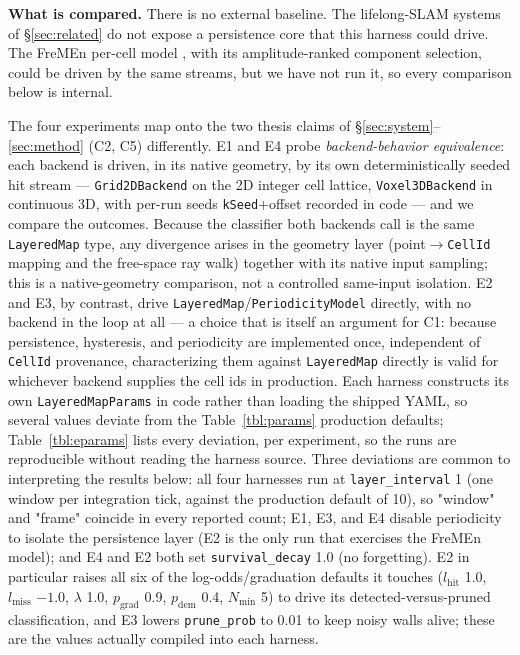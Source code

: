 \documentclass[conference]{IEEEtran}
\begin{document}
\textbf{What is compared.} There is no external baseline. The lifelong-SLAM
systems of \S\ref{sec:related} do not expose a persistence core that this
harness could drive. The FreMEn per-cell model
\cite{krajnik2017fremen,krajnik2016persistent,fremenrepo}, with its
amplitude-ranked component selection, could be driven by the same streams,
but we have not run it, so every comparison below is internal.

The four experiments map onto the two thesis claims of \S\ref{sec:system}--\ref{sec:method} (C2, C5)
differently. E1 and E4 probe \emph{backend-behavior equivalence}: each backend is
driven, in its native geometry, by its own deterministically seeded hit
stream --- \texttt{Grid2DBackend} on the 2D integer cell lattice, \texttt{Voxel3DBackend} in
continuous 3D, with per-run seeds \texttt{kSeed}+offset recorded in code --- and we
compare the outcomes. Because the classifier both backends call is the same
\texttt{LayeredMap} type, any divergence arises in the geometry layer
(point$\to$\texttt{CellId} mapping and the free-space ray walk) together with its
native input sampling; this is a native-geometry comparison, not a controlled
same-input isolation. E2 and E3, by contrast, drive \texttt{LayeredMap}/\texttt{PeriodicityModel}
directly, with no backend in the loop at all --- a choice that is itself an
argument for C1: because persistence, hysteresis, and periodicity are
implemented once, independent of \texttt{CellId} provenance, characterizing them
against \texttt{LayeredMap} directly is valid for whichever backend supplies the
cell ids in production. Each harness constructs its own \texttt{LayeredMapParams}
in code rather than loading the shipped YAML, so several values deviate from
the Table~\ref{tbl:params} production defaults; Table~\ref{tbl:eparams} lists every deviation,
per experiment, so the runs are reproducible without reading the harness
source. Three deviations are common to interpreting the results below: all
four harnesses run at \texttt{layer\_interval} 1 (one window per integration tick,
against the production default of 10), so "window" and "frame" coincide in
every reported count; E1, E3, and E4 disable periodicity to isolate the
persistence layer (E2 is the only run that exercises the FreMEn model); and
E4 and E2 both set \texttt{survival\_decay} 1.0 (no forgetting). E2 in particular
raises all six of the log-odds/graduation defaults it touches
($l_{\text{hit}}$ 1.0, $l_{\text{miss}}$ $-1.0$, $\lambda$ 1.0,
$p_{\text{grad}}$ 0.9, $p_{\text{dem}}$ 0.4, $N_{\min}$ 5) to drive its
detected-versus-pruned classification, and E3 lowers \texttt{prune\_prob} to 0.01 to
keep noisy walls alive; these are the values actually compiled into each
harness.
\end{document}
